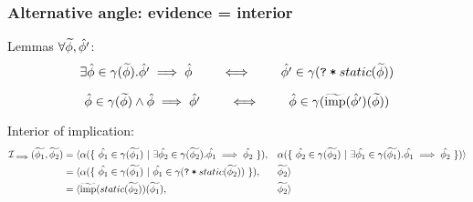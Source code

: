 \documentclass[11pt,a4paper]{article}
\begin{document}

\subsubsection{Alternative angle: evidence = interior}
Lemmas $\forall \widetilde{\phi}, \hat{\phi'}$:
\begin{displaymath}
\exists \hat{\phi} \in \gamma(\widetilde{\phi}). \hat{\phi'} \implies \hat{\phi}
\quad\quad
\iff
\quad\quad
\hat{\phi'} \in \gamma(\texttt{\texttt{?}\:*\:$static(\widetilde{\phi})$})
\end{displaymath}

\begin{displaymath}
\hat{\phi} \in \gamma(\widetilde{\phi}) \wedge \hat{\phi} \implies \hat{\phi'}
\quad\quad
\iff
\quad\quad
\hat{\phi} \in \gamma(\widetilde{\textrm{imp}}(\hat{\phi'})(\widetilde{\phi}))
\end{displaymath}


Interior of implication:
\begin{align*}
\mathcal{I}_{\implies}(\widetilde{\phi_1}, \widetilde{\phi_2})
= \langle 
    &\alpha(\{~ \hat{\phi_1} \in \gamma(\widetilde{\phi_1}) ~|~ \exists \hat{\phi_2} \in \gamma(\widetilde{\phi_2}). \hat{\phi_1} \implies \hat{\phi_2} ~\}),
    &&\alpha(\{~ \hat{\phi_2} \in \gamma(\widetilde{\phi_2}) ~|~ \exists \hat{\phi_1} \in \gamma(\widetilde{\phi_1}). \hat{\phi_1} \implies \hat{\phi_2} ~\}) 
\rangle\\
= \langle 
    &\alpha(\{~ \hat{\phi_1} \in \gamma(\widetilde{\phi_1}) ~|~ \hat{\phi_1} \in \gamma(\texttt{\texttt{?}\:*\:$static(\widetilde{\phi_2})$}) ~\}),
    &&\widetilde{\phi_2} 
\rangle\\
= \langle 
    &\widetilde{\textrm{imp}}(static(\widetilde{\phi_2}))(\widetilde{\phi_1}),
    &&\widetilde{\phi_2} 
\rangle\\
\end{align*}
\end{document}
